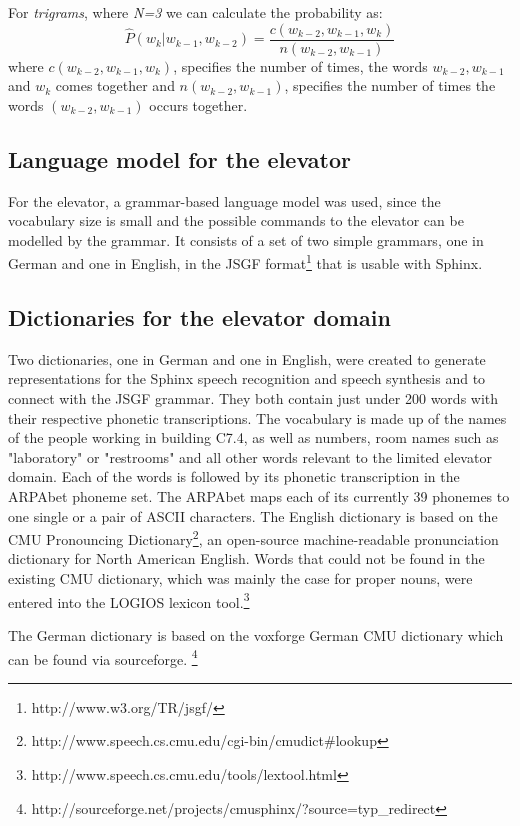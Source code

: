 \documentclass[a4paper, 12pt]{article}
\begin{document}
For \textit{trigrams}, where \textit{N=3} we can calculate the probability as:
\begin{equation}
  \hat{P}(w_k | w_{k-1},w_{k-2}) = \frac{c(w_{k-2},w_{k-1},w_k)}{n(w_{k-2},w_{k-1})} 
\end{equation}
where $c(w_{k-2},w_{k-1},w_k)$, specifies the number of times, the words $w_{k-2},w_{k-1}$ and $w_k$ comes together and $n(w_{k-2},w_{k-1})$, specifies the number of times the words $(w_{k-2},w_{k-1})$ occurs together. 

\subsection{Language model for the elevator}
For the elevator, a grammar-based language model was used, since the vocabulary size is small and the possible commands to the elevator can be modelled by the grammar. 
It consists of a set of two simple grammars, one in German and one in English, in the JSGF format\footnote{http://www.w3.org/TR/jsgf/} that is usable with Sphinx.


\subsection{Dictionaries for the elevator domain}
Two dictionaries, one in German and one in English, were created to generate representations for the Sphinx speech recognition and speech synthesis and to connect with the JSGF grammar.  
They both contain just under 200 words with their respective phonetic transcriptions. 
The vocabulary is made up of the names of the people working in building C7.4, as well as numbers, room names such as "laboratory" or "restrooms" and all other words relevant to the limited elevator domain. 
Each of the words is followed by its phonetic transcription in the ARPAbet phoneme set. 
The ARPAbet maps each of its currently 39 phonemes to one single or a pair of ASCII characters. 
The English dictionary is based on the CMU Pronouncing Dictionary\footnote{http://www.speech.cs.cmu.edu/cgi-bin/cmudict\#lookup}, an open-source  machine-readable pronunciation dictionary for North American English. 
Words that could not be found in the existing CMU dictionary, which was mainly the case for proper nouns, were entered into the LOGIOS lexicon tool.\footnote{http://www.speech.cs.cmu.edu/tools/lextool.html}


The German dictionary is based on the voxforge German CMU dictionary which can be found via sourceforge.%
\footnote{http://sourceforge.net/projects/cmusphinx/?source=typ\_redirect}
\end{document}
